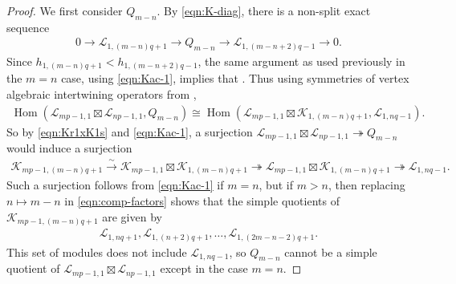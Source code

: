 \documentclass[pdftex]{sigma}
\numberwithin{equation}{section}
\theoremstyle{definition}
\begin{document}
\begin{proof}
We first consider $Q_{m-n}$. By \eqref{eqn:K-diag}, there is a non-split exact sequence
\begin{gather*}
0\longrightarrow\mathcal{L}_{1,(m-n)q+1}\longrightarrow Q_{m-n}\longrightarrow\mathcal{L}_{1,(m-n+2)q-1}\longrightarrow 0.
\end{gather*}
Since $h_{1,(m-n)q+1}<h_{1,(m-n+2)q-1}$, the same argument as used previously in the $m=n$ case, using \eqref{eqn:Kac-1}, implies that . Thus using symmetries of vertex algebraic intertwining operators from \cite{FHL},
\begin{gather*}
\operatorname{Hom}(\mathcal{L}_{mp-1,1} \boxtimes \mathcal{L}_{np-1,1}, Q_{m-n}) \cong \operatorname{Hom}(\mathcal{L}_{mp-1,1} \boxtimes\mathcal{K}_{1,(m-n)q+1}, \mathcal{L}_{1,nq-1}).
\end{gather*}
So by \eqref{eqn:Kr1xK1s} and \eqref{eqn:Kac-1}, a surjection $\mathcal{L}_{mp-1,1}\boxtimes\mathcal{L}_{np-1,1}\twoheadrightarrow Q_{m-n}$ would induce a surjection
\begin{gather*}
\mathcal{K}_{mp-1,(m-n)q+1}\xrightarrow{\sim}\mathcal{K}_{mp-1,1}\boxtimes\mathcal{K}_{1,(m-n)q+1}\twoheadrightarrow \mathcal{L}_{mp-1,1}\boxtimes\mathcal{K}_{1,(m-n)q+1}\twoheadrightarrow\mathcal{L}_{1,nq-1}.
\end{gather*}
Such a surjection follows from \eqref{eqn:Kac-1} if $m=n$, but if $m>n$, then replacing $n\mapsto m-n$ in \eqref{eqn:comp-factors} shows that the simple quotients of $\mathcal{K}_{mp-1,(m-n)q+1}$ are given by
\begin{gather*}
\mathcal{L}_{1,nq+1},\mathcal{L}_{1,(n+2)q+1},\ldots,\mathcal{L}_{1,(2m-n-2)q+1}.
\end{gather*}
This set of modules does not include $\mathcal{L}_{1,nq-1}$, so $Q_{m-n}$ cannot be a simple quotient of $\mathcal{L}_{mp-1,1}\boxtimes\mathcal{L}_{np-1,1}$ except in the case $m=n$.


\end{proof}
\end{document}

